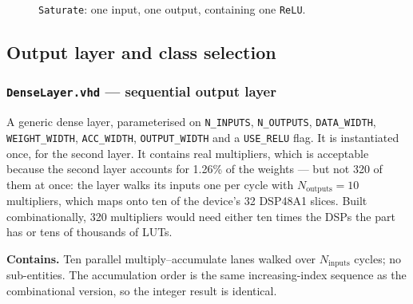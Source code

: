 \documentclass[11pt,a4paper]{article}
\begin{document}
\begin{figure}[H]
\centering
{}
\caption{\texttt{Saturate}: one input, one output, containing one
  \texttt{ReLU}.}
\label{fig:sat}
\end{figure}

\subsection{Output layer and class selection}

\subsubsection{\texttt{DenseLayer.vhd} --- sequential output layer}
\label{sub:denselayer}

A generic dense layer, parameterised on \texttt{N\_INPUTS},
\texttt{N\_OUTPUTS}, \texttt{DATA\_WIDTH}, \texttt{WEIGHT\_WIDTH},
\texttt{ACC\_WIDTH}, \texttt{OUTPUT\_WIDTH} and a \texttt{USE\_RELU} flag. It
is instantiated once, for the second layer. It contains real multipliers, which
is acceptable because the second layer accounts for 1.26\% of the weights ---
but not 320 of them at once: the layer walks its inputs one per cycle with
$N_{\text{outputs}} = 10$ multipliers, which maps onto ten of the device's
32 DSP48A1 slices. Built combinationally, 320 multipliers would need either ten
times the DSPs the part has or tens of thousands of LUTs.

\textbf{Contains.} Ten parallel multiply--accumulate lanes walked over
$N_{\text{inputs}}$ cycles; no sub-entities. The accumulation order is the same
increasing-index sequence as the combinational version, so the integer result is
identical.
\end{document}
